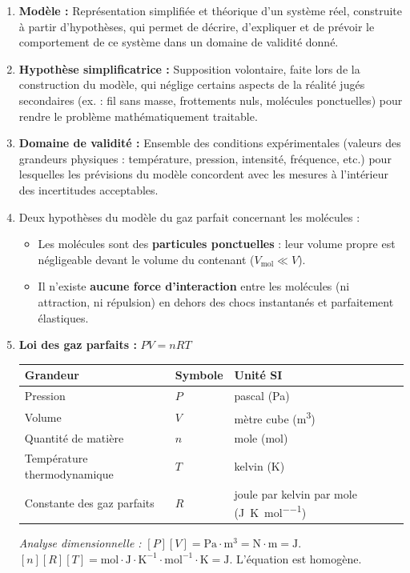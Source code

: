 \documentclass[11pt]{article}
\begin{document}
\begin{corrige}
\begin{enumerate}
\item \textbf{Modèle :} Représentation simplifiée et théorique d'un système réel, construite à partir d'hypothèses, qui permet de décrire, d'expliquer et de prévoir le comportement de ce système dans un domaine de validité donné.
\item \textbf{Hypothèse simplificatrice :} Supposition volontaire, faite lors de la construction du modèle, qui néglige certains aspects de la réalité jugés secondaires (ex. : fil sans masse, frottements nuls, molécules ponctuelles) pour rendre le problème mathématiquement traitable.
\item \textbf{Domaine de validité :} Ensemble des conditions expérimentales (valeurs des grandeurs physiques : température, pression, intensité, fréquence, etc.) pour lesquelles les prévisions du modèle concordent avec les mesures à l'intérieur des incertitudes acceptables.
\item Deux hypothèses du modèle du gaz parfait concernant les molécules :
      \begin{itemize}
      \item Les molécules sont des \textbf{particules ponctuelles} : leur volume propre est négligeable devant le volume du contenant ($V_{\text{mol}} \ll V$).
      \item Il n'existe \textbf{aucune force d'interaction} entre les molécules (ni attraction, ni répulsion) en dehors des chocs instantanés et parfaitement élastiques.
      \end{itemize}
\item \textbf{Loi des gaz parfaits :} $PV = nRT$
      \begin{center}
      \begin{tabular}{|l|l|l|}\hline
      \textbf{Grandeur} & \textbf{Symbole} & \textbf{Unité SI} \\ \hline
      Pression & $P$ & pascal (\si{\pascal}) \\
      Volume & $V$ & mètre cube (\si{\cubic\meter}) \\
      Quantité de matière & $n$ & mole (\si{\mole}) \\
      Température thermodynamique & $T$ & kelvin (\si{\kelvin}) \\
      Constante des gaz parfaits & $R$ & joule par kelvin par mole (\si{\joule\per\kelvin\per\mole}) \\ \hline
      \end{tabular}
      \end{center}
      \textit{Analyse dimensionnelle :} $[P][V] = \mathrm{Pa}\cdot\mathrm{m}^3 = \mathrm{N}\cdot\mathrm{m} = \mathrm{J}$. $[n][R][T] = \mathrm{mol}\cdot\mathrm{J}\cdot\mathrm{K}^{-1}\cdot\mathrm{mol}^{-1}\cdot\mathrm{K} = \mathrm{J}$. L'équation est homogène.
\end{enumerate}
\end{corrige}
\end{document}
